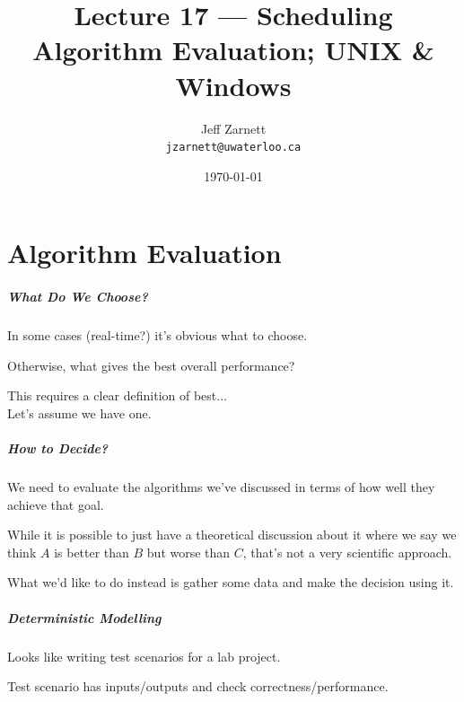 

\title{Lecture 17 --- Scheduling Algorithm Evaluation; UNIX \& Windows}

\author{Jeff Zarnett \\ \small \texttt{jzarnett@uwaterloo.ca}}
\date{\today}




\begin{frame}
  \titlepage

 \end{frame}
 
\part{Algorithm Evaluation}

\begin{frame}
\partpage
\end{frame}
 
\begin{frame}
\frametitle{What Do We Choose?}

In some cases (real-time?) it's obvious what to choose.

Otherwise, what gives the best overall performance?

This requires a clear definition of best...\\
\quad Let's assume we have one.

\end{frame}

\begin{frame}
\frametitle{How to Decide?}

We need to evaluate the algorithms we've discussed in terms of how well they achieve that goal. 

While it is possible to just have a theoretical discussion about it where we say we think $A$ is better than $B$ but worse than $C$, that's not a very scientific approach. 

What we'd like to do instead is gather some data and make the decision using it.

\end{frame}

\begin{frame}
\frametitle{Deterministic Modelling}

Looks like writing test scenarios for a lab project.

Test scenario has inputs/outputs and check correctness/performance.

\end{frame}

